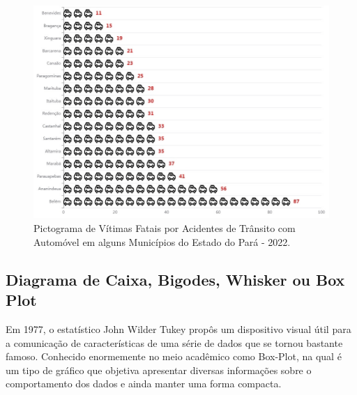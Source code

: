 \vspace{-0.85cm}
\begin{figure}[H]
    \centering
\includegraphics[scale=0.25,height=230pt,width=12cm]{figures/pictograma2.jpeg}
\vspace{-0.5cm}
    \caption{Pictograma de Vítimas Fatais por Acidentes de Trânsito com Automóvel em alguns Municípios do Estado do Pará - 2022.}
    \label{fig:my_label51}
\end{figure}






















\newpage 
\subsection{Diagrama de Caixa, Bigodes, Whisker ou Box Plot}

\inic Em 1977, o estatístico John Wilder Tukey propôs um dispositivo visual útil
para a comunicação de características de uma série de dados que se
tornou bastante famoso. Conhecido enormemente no meio acadêmico
como Box-Plot, na qual é um tipo de gráfico que objetiva
apresentar diversas informações sobre o comportamento dos dados e
ainda manter uma forma compacta. 

